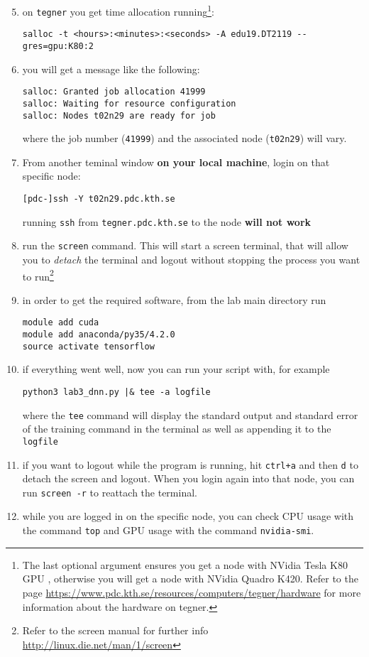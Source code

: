 \documentclass{nada-ten}
\begin{document}
\begin{enumerate}
\setcounter{enumi}{4}
\item on \texttt{tegner} you get time allocation running\footnote{The last optional argument ensures you get a node with NVidia Tesla K80 GPU , otherwise you will get a node with NVidia Quadro K420. Refer to the page \url{https://www.pdc.kth.se/resources/computers/tegner/hardware} for more information about the hardware on tegner.}:
\begin{verbatim}
salloc -t <hours>:<minutes>:<seconds> -A edu19.DT2119 --gres=gpu:K80:2
\end{verbatim}
\item you will get a message like the following:
\begin{verbatim}
salloc: Granted job allocation 41999
salloc: Waiting for resource configuration
salloc: Nodes t02n29 are ready for job
\end{verbatim}
where the job number (\texttt{41999}) and the associated node (\texttt{t02n29}) will vary.
\item From another teminal window \textbf{on your local machine}, login on that specific node:
\begin{verbatim}
[pdc-]ssh -Y t02n29.pdc.kth.se
\end{verbatim}
running \texttt{ssh} from \texttt{tegner.pdc.kth.se} to the node \textbf{will not work}
\item run the \texttt{screen} command. This will start a screen terminal, that will allow you to \emph{detach} the terminal and logout without stopping the process you want to run\footnote{Refer to the screen manual for further info \url{http://linux.die.net/man/1/screen}}
\item in order to get the required software, from the lab main directory run
\begin{verbatim}
module add cuda
module add anaconda/py35/4.2.0
source activate tensorflow
\end{verbatim}
\item if everything went well, now you can run your script with, for example
\begin{verbatim}
python3 lab3_dnn.py |& tee -a logfile
\end{verbatim}
where the \texttt{tee} command will display the standard output and standard error of the training command in the terminal as well as appending it to the \texttt{logfile}
\item if you want to logout while the program is running, hit \texttt{ctrl+a} and then \texttt{d} to detach the screen and logout. When you login again into that node, you can run \texttt{screen -r} to reattach the terminal.
\item while you are logged in on the specific node, you can check CPU usage with the command \texttt{top} and GPU usage with the command \texttt{nvidia-smi}.
\end{enumerate}
\end{document}
